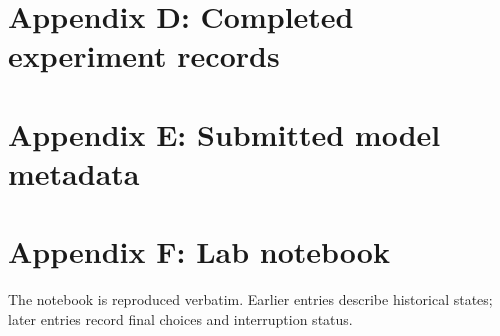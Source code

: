 \documentclass[11pt]{article}
\begin{document}
\section*{Appendix D: Completed experiment records}
\section*{Appendix E: Submitted model metadata}
\clearpage
\section*{Appendix F: Lab notebook}
The notebook is reproduced verbatim. Earlier entries describe historical states; later entries record final choices and interruption status.
\end{document}
